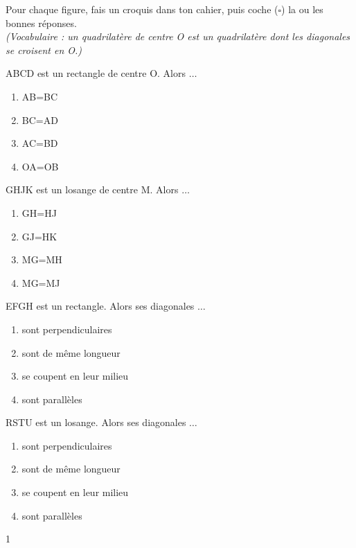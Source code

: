 \documentclass[a4paper,11pt]{report}
\begin{document}
\begin{exo}{
    Pour chaque figure, fais un croquis dans ton cahier, puis coche (\makebox[0pt][l]{$\checkmark$}$\square$) la ou les bonnes réponses. \\
    {\small \textit{(Vocabulaire : un quadrilatère de centre O est un quadrilatère dont les diagonales se croisent en O.)}}
    
    
    \begin{tasks}
        \task ABCD est un rectangle de centre O.  Alors $\ldots$
        {\setlength\columnsep{-10pt}
        \begin{multicols}{4}
        \begin{enumerate}[label=$\square$]
            \item AB=BC
            \item BC=AD
            \item AC=BD
            \item OA=OB
        \end{enumerate}
        \end{multicols}}
        \task GHJK est un losange de centre M. Alors $\ldots$
        {\setlength\columnsep{-10pt}
        \begin{multicols}{4}
        \begin{enumerate}[label=$\square$]
            \item GH=HJ
            \item GJ=HK
            \item MG=MH
            \item MG=MJ
        \end{enumerate}
        \end{multicols}}

        
        \task EFGH est un rectangle. Alors ses diagonales $\ldots$
        {\setlength\columnsep{-10pt}
        \begin{multicols}{2}
        \begin{enumerate}[label=$\square$]
            \item sont perpendiculaires
            \item sont de même longueur
            \item se coupent en leur milieu
            \item sont parallèles
        \end{enumerate}
        \end{multicols}}
        
        \task RSTU est un losange. Alors ses diagonales $\ldots$
       {\setlength\columnsep{-10pt}
        \begin{multicols}{2}
        \begin{enumerate}[label=$\square$]
            \item sont perpendiculaires
            \item sont de même longueur
            \item se coupent en leur milieu
            \item sont parallèles
        \end{enumerate}
        \end{multicols}}
\end{tasks}
}{1}
\end{exo}
\end{document}
